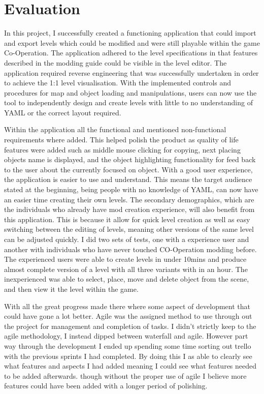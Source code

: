 \section{Evaluation}

In this project, I successfully created a functioning application that could import and export levels which could be modified and were still playable within the game Co-Operation. The application adhered to the level specifications in that features described in the modding guide could be visible in the level editor. The application required reverse engineering that was successfully undertaken in order to achieve the 1:1 level visualisation. With the implemented controls and procedures for map and object loading and manipulations, users can now use the tool to independently design and create levels with little to no understanding of YAML or the correct layout required. 

Within the application all the functional and mentioned non-functional requirements where added. This helped polish the product as quality of life features were added such as middle mouse clicking for copying, next placing objects name is displayed, and the object highlighting functionality for feed back to the user about the currently focused on object. With a good user experience, the application is easier to use and understand. This means the target audience stated at the beginning, being people with no knowledge of YAML, can now have an easier time creating their own levels. The secondary demographics, which are the individuals who already have mod creation experience, will also benefit from this application. This is because it allow for quick level creation as well as easy switching between the editing of levels, meaning other versions of the same level can be adjusted quickly. I did two sets of tests, one with a experience user and another with individuals who have never touched CO-Operation modding before. The experienced users were able to create levels in under 10mins and produce almost complete version of a level with all three variants with in an hour. The inexperienced was able to select, place, move and delete object from the scene, and then view it the level within the game.

With all the great progress made there where some aspect of development that could have gone a lot better. Agile was the assigned method to use through out the project for management and completion of tasks. I didn't strictly keep to the agile methodology, I instead dipped between waterfall and agile. However part way through the development I ended up spending some time sorting out trello with the previous sprints I had completed. By doing this I as able to clearly see what features and aspects I had added meaning I could see what features needed to be added afterwards. though without the proper use of agile I believe more features could have been added with a longer period of polishing.

